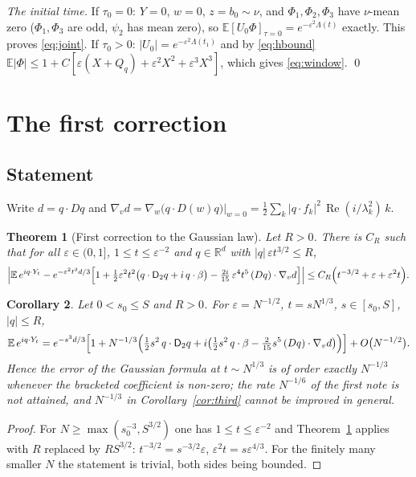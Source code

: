 \documentclass[11pt]{article}
\newcommand{\E}{\mathbb{E}}
\newcommand{\eps}{\varepsilon}
\newcommand{\sD}{\mathsf{D}}
\renewcommand{\Re}{\operatorname{Re}}
\newtheorem{theorem}{Theorem}
\newtheorem{corollary}[theorem]{Corollary}
\theoremstyle{remark}
\begin{document}
\emph{The initial time.} If $\tau_0 = 0$: $Y=0$, $w=0$, $z = b_0\sim\nu$, and
$\Phi_1,\Phi_2,\Phi_3$ have $\nu$-mean zero ($\Phi_1,\Phi_3$ are odd, $\psi_2$
has mean zero), so $\E[U_0\Phi]_{\tau=0} = e^{-\eps^2\Lambda(t)}$ exactly. This
proves \eqref{eq:joint}. If $\tau_0>0$: $|U_0| = e^{-\eps^2\Lambda(t_1)}$ and
by \eqref{eq:hbound}
$\E|\Phi|\le1 + C[\eps(X+Q_q)+\eps^2X^2+\eps^3X^3]$, which gives
\eqref{eq:window}. \qed

\section{The first correction}

\subsection{Statement}

Write $d = q\cdot Dq$ and
$\nabla_vd = \nabla_w\bigl(q\cdot D(w)q\bigr)\big|_{w=0}
= \tfrac12\sum_k|q\cdot f_k|^2\,\Re(i/\lambda_k^2)\,k$.

\begin{theorem}[First correction to the Gaussian law]\label{thm:first}
Let $R>0$. There is $C_R$ such that for all $\eps\in(0,1]$,
$1\le t\le\eps^{-2}$ and $q\in\mathbb{R}^d$ with $|q|\,\eps t^{3/2}\le R$,
\begin{equation}
  \Bigl|\E\,e^{iq\cdot Y_t} - e^{-\eps^2t^3d/3}\Bigl[1
    + \tfrac12\eps^2t^2\bigl(q\cdot\sD_2q + i\,q\cdot\beta\bigr)
    - \tfrac{2i}{15}\,\eps^4t^5\,(Dq)\cdot\nabla_vd\Bigr]\Bigr|
  \le C_R\Bigl(t^{-3/2} + \eps + \eps^2t\Bigr).
  \label{eq:first}
\end{equation}
\end{theorem}

\begin{corollary}\label{cor:firstN}
Let $0<s_0\le S$ and $R>0$. For $\eps = N^{-1/2}$, $t = sN^{1/3}$,
$s\in[s_0,S]$, $|q|\le R$,
\[
  \E\,e^{iq\cdot Y_t} = e^{-s^3d/3}\Bigl[1 + N^{-1/3}\Bigl(
     \tfrac12s^2\,q\cdot\sD_2q + i\bigl(\tfrac12s^2\,q\cdot\beta
     - \tfrac2{15}s^5\,(Dq)\cdot\nabla_vd\bigr)\Bigr)\Bigr]
   + O\bigl(N^{-1/2}\bigr).
\]
Hence the error of the Gaussian formula at $t\sim N^{1/3}$ is of order
exactly $N^{-1/3}$ whenever the bracketed coefficient is non-zero; the rate
$N^{-1/6}$ of the first note is not attained, and $N^{-1/3}$ in
Corollary~\ref{cor:third} cannot be improved in general.
\end{corollary}

\begin{proof}
For $N\ge\max(s_0^{-3},S^{3/2})$ one has $1\le t\le\eps^{-2}$ and
Theorem~\ref{thm:first} applies with $R$ replaced by $RS^{3/2}$:
$t^{-3/2} = s^{-3/2}\eps$, $\eps^2t = s\eps^{4/3}$. For the finitely many
smaller $N$ the statement is trivial, both sides being bounded.
\end{proof}
\end{document}
